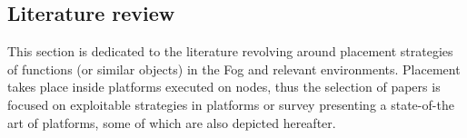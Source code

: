 \documentclass[11pt]{sdm}
\begin{document}
\subsection{Literature review \label{sec:literature_review}}

This section is dedicated to the literature revolving around placement strategies of functions (or similar objects) in the Fog and relevant environments. Placement takes place inside platforms executed on nodes, thus the selection of papers is focused on exploitable strategies in platforms or  survey presenting a state-of-the art of platforms, some of which are also depicted hereafter.

\end{document}
